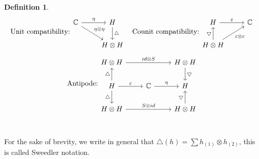 \documentclass[12pt,a4paper]{article}
\newtheorem{definition}[theorem]{Definition}
\newcommand\1{_{(1)}}
\newcommand\2{_{(2)}}
\begin{document}
\begin{definition}
\[\]
\[
\text{Unit compatibility:}\begin{tikzcd}
\mathbb{C} \arrow[rd, "\eta\otimes\eta"] \arrow[r, "\eta"] & H \arrow[d, "\triangle"] \\
                                                    & H\otimes H              
\end{tikzcd}
\text{\;\;\;Counit compatibility:}
\begin{tikzcd}
H \arrow[r, "\varepsilon"]                                                         & \mathbb{C} \\
H\otimes H \arrow[u, "\bigtriangledown"] \arrow[ru, "\varepsilon\otimes\varepsilon"'] &    
\end{tikzcd}
\]
\[
\text{Antipode:}
\begin{tikzcd}
H\otimes H \arrow[rr, "id\otimes S"]                                      &                       & H\otimes H \arrow[d, "\bigtriangledown"] \\
H \arrow[u, "\triangle"] \arrow[d, "\triangle"'] \arrow[r, "\varepsilon"] & \mathbb{C} \arrow[r, "\eta"] & H                                     \\
H\otimes H \arrow[rr, "S\otimes id"]                                      &                       & H\otimes H \arrow[u, "\bigtriangledown"]
\end{tikzcd}
\]\\
\end{definition}

For the sake of brevity, we write in general that $\triangle(h)=\sum h\1\otimes h\2$, this is called Sweedler notation.\\
\end{document}
